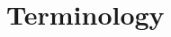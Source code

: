 \documentclass[11pt,article,oneside]{memoir}
\begin{document}



\clearpage

\section{Terminology}
\end{document}
